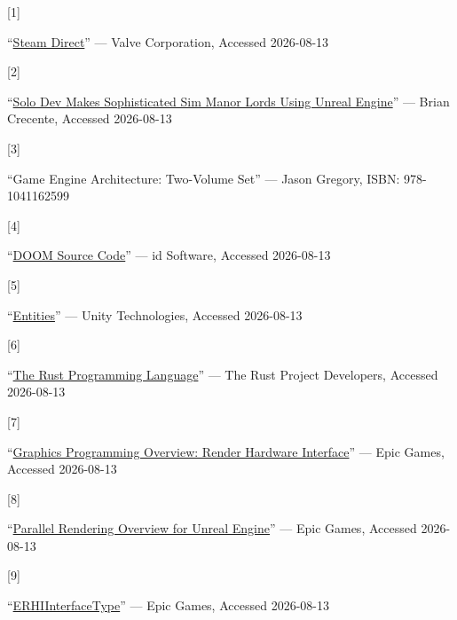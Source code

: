 \documentclass[
  11pt,
  letterpaper,
  DIV=11,
  numbers=noendperiod,
  twoside,
  open=right]{scrreprt}
\newlength{\cslhangindent}
\newlength{\csllabelwidth}
\newenvironment{CSLReferences}[2] %
 {\begin{list}{}{%
  \setlength{\itemindent}{0pt}
  \setlength{\leftmargin}{0pt}
  \setlength{\parsep}{0pt}
  \ifodd #1
   \setlength{\leftmargin}{\cslhangindent}
   \setlength{\itemindent}{-1\cslhangindent}
  \fi
  \setlength{\itemsep}{#2\baselineskip}}}
 {\end{list}}
\newcommand{\CSLLeftMargin}[1]{\parbox[t]{\csllabelwidth}{\strut#1\strut}}
\newcommand{\CSLRightInline}[1]{\parbox[t]{\linewidth - \csllabelwidth}{\strut#1\strut}}
\begin{document}
\protect{}\label{refs}
\begin{CSLReferences}{0}{1}
\CSLLeftMargin{{[}1{]} }%
\CSLRightInline{{``\href{https://partner.steamgames.com/steamdirect}{{Steam
Direct}}''} --- Valve Corporation, Accessed 2026-08-13}

\CSLLeftMargin{{[}2{]} }%
\CSLRightInline{{``\href{https://www.unrealengine.com/developer-interviews/solo-dev-makes-sophisticated-sim-manor-lords-using-unreal-engine}{{Solo
Dev Makes Sophisticated Sim Manor Lords Using Unreal Engine}}''} ---
Brian Crecente, Accessed 2026-08-13}

\CSLLeftMargin{{[}3{]} }%
\CSLRightInline{{``{Game Engine Architecture: Two-Volume Set}''} ---
Jason Gregory, ISBN: 978-1041162599}

\CSLLeftMargin{{[}4{]} }%
\CSLRightInline{{``\href{https://github.com/id-Software/DOOM}{{DOOM
Source Code}}''} --- {id Software}, Accessed 2026-08-13}

\CSLLeftMargin{{[}5{]} }%
\CSLRightInline{{``\href{https://docs.unity3d.com/Manual/com.unity.entities.html}{Entities}''}
--- Unity Technologies, Accessed 2026-08-13}

\CSLLeftMargin{{[}6{]} }%
\CSLRightInline{{``\href{https://doc.rust-lang.org/book/}{{The Rust
Programming Language}}''} --- The Rust Project Developers, Accessed
2026-08-13}

\CSLLeftMargin{{[}7{]} }%
\CSLRightInline{{``\href{https://dev.epicgames.com/documentation/en-us/unreal-engine/graphics-programming-overview?application_version=4.27}{{Graphics
Programming Overview: Render Hardware Interface}}''} --- Epic Games,
Accessed 2026-08-13}

\CSLLeftMargin{{[}8{]} }%
\CSLRightInline{{``\href{https://dev.epicgames.com/documentation/en-us/unreal-engine/parallel-rendering-overview-for-unreal-engine}{{Parallel
Rendering Overview for Unreal Engine}}''} --- Epic Games, Accessed
2026-08-13}

\CSLLeftMargin{{[}9{]} }%
\CSLRightInline{{``\href{https://dev.epicgames.com/documentation/en-us/unreal-engine/API/Runtime/RHI/ERHIInterfaceType}{ERHIInterfaceType}''}
--- Epic Games, Accessed 2026-08-13}


\end{CSLReferences}
\end{document}
